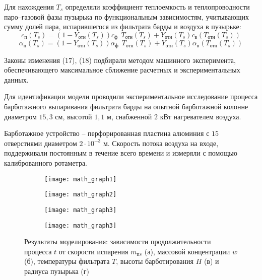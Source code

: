 Для нахождения $T_s$ определяли коэффициент теплоемкость и теплопроводности паро--газовой фазы пузырька по функциональным зависимостям, учитывающих сумму долей пара, испарившегося из фильтрата барды и воздуха в пузырьке:
\begin{equation} \label{ZEqnNum894908} 
c_{{ п}}\left(T_s\right){ =}\left({ 1-}Y_{{ отн}}\left(T_s\right)\right)c_{{ ф}}{ \ \ }T_{{ отн}}\left(T_s\right){ +}Y_{{ отн}}\left(T_s\right)c_{{ в}}\left(T_{{ отн}}\left(T_s\right)\right) 
\end{equation} 
\begin{equation} \label{ZEqnNum280770} 
{\alpha }_{{ п}}\left(T_s\right){ =}\left({ 1-}Y_{{ отн}}\left(T_s\right)\right){\alpha }_{{ ф}}{ \ \ }T_{{ отн}}\left(T_s\right){ +}Y_{{ отн}}\left(T_s\right){\alpha }_{{ в}}\left(T_{{ отн}}\left(T_s\right)\right) 
\end{equation} 

Законы изменения (17), (18) подбирали методом машинного эксперимента, обеспечивающего максимальное сближение расчетных и экспериментальных данных.

Для идентификации модели проводили экспериментальное исследование процесса барботажного выпаривания фильтрата барды на опытной барботажной колонне диаметром ${ 15,3}$ см, высотой ${ 1,1}$ м, снабженной ${ 2}$ кВт нагревателем воздуха. 

Барботажное устройство -- перфорированная пластина алюминия с ${ 15}$ отверстиями диаметром ${ 2}\cdot { 1}0^{{ -}{ 3}}$ м. 
Скорость потока воздуха на входе, поддерживали постоянным в течение всего времени и измеряли с помощью калиброванного ротаметра.

\begin{figure}[b!]
\centering
\begin{subfigure}{0.45\linewidth}
\centering
\texttt{[image: math\_graph1]}
\caption{}\label{fig:math_results1}
\label{fig:main_view_membrane1}
\end{subfigure}
\quad
\begin{subfigure}{0.45\linewidth}
\centering
\texttt{[image: math\_graph2]}
\caption{}\label{fig:math_results2}
\label{fig:main_view_membrane2}
\end{subfigure}
\quad
\begin{subfigure}{0.45\linewidth}
\centering
\texttt{[image: math\_graph3]}
\caption{}\label{fig:math_results3}
\label{fig:main_view_membrane3}
\end{subfigure}
\quad
\begin{subfigure}{0.45\linewidth}
\centering
\texttt{[image: math\_graph3]}
\caption{}\label{fig:math_results4}
\label{fig:main_view_membrane4}
\end{subfigure}
\caption[Результаты моделирования]{Результаты моделирования: зависимости продолжительности процесса $t$ от скорости испарения $m_{{ пs}}$ (а), массовой концентрации $w$ (б), температуры фильтрата $T$, высоты барботирования $H$ (в) и радиуса пузырька (г)}
\end{figure}


